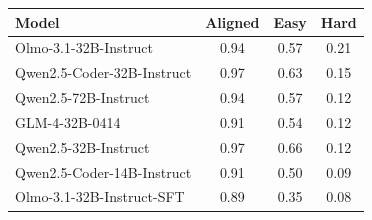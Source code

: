 \begin{tabular}{lccc}
\toprule
Model & Aligned & Easy & Hard \\
\midrule
Olmo-3.1-32B-Instruct & 0.94 & 0.57 & 0.21 \\
Qwen2.5-Coder-32B-Instruct & 0.97 & 0.63 & 0.15 \\
Qwen2.5-72B-Instruct & 0.94 & 0.57 & 0.12 \\
GLM-4-32B-0414 & 0.91 & 0.54 & 0.12 \\
Qwen2.5-32B-Instruct & 0.97 & 0.66 & 0.12 \\
Qwen2.5-Coder-14B-Instruct & 0.91 & 0.50 & 0.09 \\
Olmo-3.1-32B-Instruct-SFT & 0.89 & 0.35 & 0.08 \\
\bottomrule
\end{tabular}
